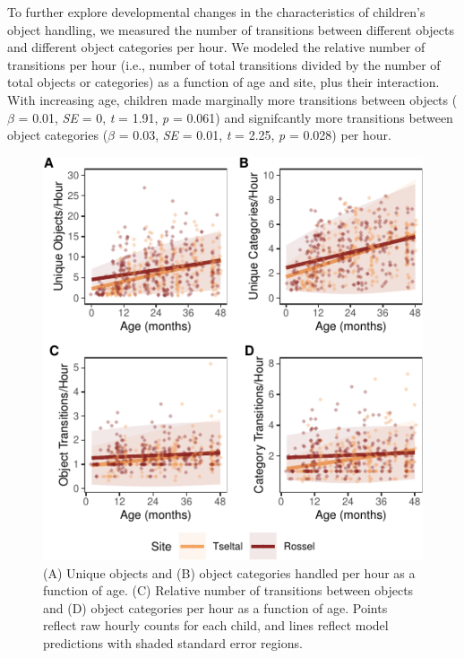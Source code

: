 \documentclass[10pt, letterpaper]{article}
\newenvironment{CodeChunk}{}{}
\begin{document}
To further explore developmental changes in the characteristics of
children's object handling, we measured the number of transitions
between different objects and different object categories per hour. We
modeled the relative number of transitions per hour (i.e., number of
total transitions divided by the number of total objects or categories)
as a function of age and site, plus their interaction. With increasing
age, children made marginally more transitions between objects
(\(\beta\) = 0.01, \emph{SE} = 0, \emph{t} = 1.91, \emph{p} = 0.061) and
signifcantly more transitions between object categories (\(\beta\) =
0.03, \emph{SE} = 0.01, \emph{t} = 2.25, \emph{p} = 0.028) per hour.

\begin{CodeChunk}
\begin{figure}[!ht]

{\centering \includegraphics{figs/age-effects-fig-1} 

}

\caption[(A) Unique objects and (B) object categories handled per hour as a function of age]{(A) Unique objects and (B) object categories handled per hour as a function of age. (C) Relative number of transitions between objects and (D) object categories per hour as a function of age. Points reflect raw hourly counts for each child, and lines reflect model predictions with shaded standard error regions.}\label{fig:age-effects-fig}
\end{figure}
\end{CodeChunk}
\end{document}
